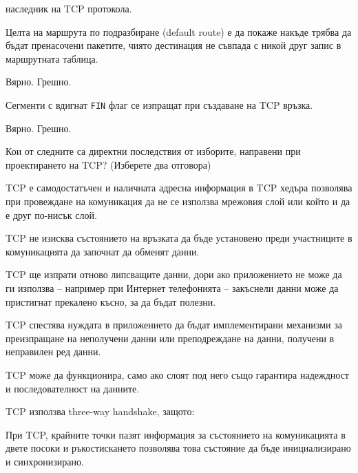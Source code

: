 \begin{questions}
\begin{choices}
    \choice наследник на TCP протокола.
  \end{choices}

  \question[6] Целта на маршрута по подразбиране
  (\foreignlanguage{english}{default route}) е да покаже накъде трябва да бъдат
  пренасочени пакетите, чиято дестинация не съвпада с никой друг запис в
  маршрутната таблица.
  \begin{oneparchoices}
    \CorrectChoice Вярно.
    \choice Грешно.
  \end{oneparchoices}

  \question[6] Сегменти с вдигнат \texttt{FIN} флаг се изпращат при създаване на
  TCP връзка.
  \begin{oneparchoices}
    \choice Вярно.
    \CorrectChoice Грешно.
  \end{oneparchoices}

  \question[6] Кои от следните са директни последствия от изборите, направени
  при проектирането на TCP? (Изберете два отговора)
  \begin{choices}
    \choice TCP е самодостатъчен и наличната адресна информация в TCP хедъра
    позволява при провеждане на комуникация да не се използва мрежовия слой или
    който и да е друг по-нисък слой.

    \choice TCP не изисква състоянието на връзката да бъде установено преди
    участниците в комуникацията да започнат да обменят данни.

    \CorrectChoice TCP ще изпрати отново липсващите данни, дори ако приложението
    не може да ги използва -- например при Интернет телефонията -- закъснели
    данни може да пристигнат прекалено късно, за да бъдат полезни.

    \CorrectChoice TCP спестява нуждата в приложението да бъдат имплементирани
    механизми за преизпращане на неполучени данни или преподреждане на данни,
    получени в неправилен ред данни.

    \choice TCP може да функционира, само ако слоят под него също гарантира
    надеждност и последователност на данните.
  \end{choices}

  \question[6] TCP използва three-way handshake, защото:
  \begin{choices}

    \CorrectChoice При TCP, крайните точки пазят информация за състоянието на
    комуникацията в двете посоки и ръкостискането позволява това състояние да
    бъде инициализирано и синхронизирано.


\end{choices}
\end{questions}
